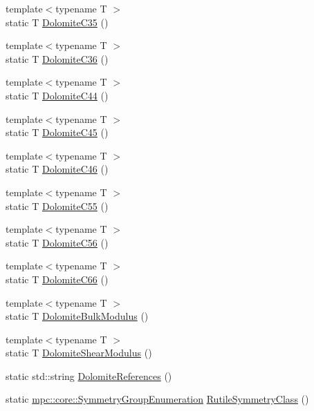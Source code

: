 \begin{DoxyCompactItemize}
\item 
{\footnotesize template$<$typename T $>$ }\\static T \mbox{\hyperlink{namespacempc_1_1data_a2b91c5e718a91e077f5ebdf15fbfbe23}{Dolomite\+C35}} ()
\item 
{\footnotesize template$<$typename T $>$ }\\static T \mbox{\hyperlink{namespacempc_1_1data_a01cf014eaa7d90a04a64a1828e59f5fa}{Dolomite\+C36}} ()
\item 
{\footnotesize template$<$typename T $>$ }\\static T \mbox{\hyperlink{namespacempc_1_1data_ac91d560c4e6b016ba2b173abab7b343b}{Dolomite\+C44}} ()
\item 
{\footnotesize template$<$typename T $>$ }\\static T \mbox{\hyperlink{namespacempc_1_1data_ac1c0910f14182b11b199cdabe4adb2cb}{Dolomite\+C45}} ()
\item 
{\footnotesize template$<$typename T $>$ }\\static T \mbox{\hyperlink{namespacempc_1_1data_a89b9c8968c831bb40839aa5dbb461a1d}{Dolomite\+C46}} ()
\item 
{\footnotesize template$<$typename T $>$ }\\static T \mbox{\hyperlink{namespacempc_1_1data_a34716b77df69de4fdf1657a2400716f2}{Dolomite\+C55}} ()
\item 
{\footnotesize template$<$typename T $>$ }\\static T \mbox{\hyperlink{namespacempc_1_1data_a2902be6f05b33f47f37569b26822c79f}{Dolomite\+C56}} ()
\item 
{\footnotesize template$<$typename T $>$ }\\static T \mbox{\hyperlink{namespacempc_1_1data_aa7bee5f2451711445b104cc02ae05e04}{Dolomite\+C66}} ()
\item 
{\footnotesize template$<$typename T $>$ }\\static T \mbox{\hyperlink{namespacempc_1_1data_ac918dcf9bc6460fb502245d3726529f2}{Dolomite\+Bulk\+Modulus}} ()
\item 
{\footnotesize template$<$typename T $>$ }\\static T \mbox{\hyperlink{namespacempc_1_1data_afb6ba286047642b150496abbc23f58dd}{Dolomite\+Shear\+Modulus}} ()
\item 
static std\+::string \mbox{\hyperlink{namespacempc_1_1data_a084c7c33af3278c88d9d509a0985f43a}{Dolomite\+References}} ()
\item 
static \mbox{\hyperlink{namespacempc_1_1core_a9d979684062547055a0ef5c13077bad8}{mpc\+::core\+::\+Symmetry\+Group\+Enumeration}} \mbox{\hyperlink{namespacempc_1_1data_ae3cfbb5aa0ec9a928516d982839f302c}{Rutile\+Symmetry\+Class}} ()

\end{DoxyCompactItemize}
